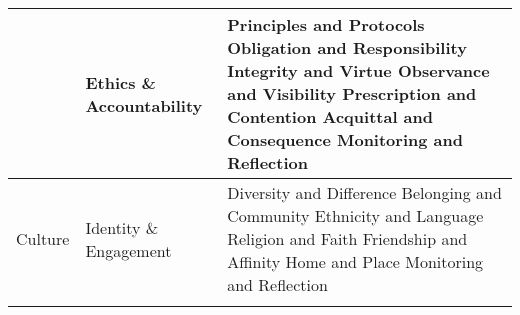\begin{table}[th]
\begin{center}
\begin{tabular}{ >{\raggedright\arraybackslash}p{} >{\raggedright\arraybackslash}p{} >{\raggedright\arraybackslash}p{} }
  & Ethics \& Accountability & Principles and Protocols \linebreak Obligation and Responsibility \linebreak Integrity and Virtue \linebreak Observance and Visibility \linebreak Prescription and Contention \linebreak Acquittal and Consequence \linebreak Monitoring and Reflection \linebreak \\
\hline
Culture & Identity \& Engagement & Diversity and Difference \linebreak Belonging and Community \linebreak Ethnicity and Language \linebreak Religion and Faith \linebreak Friendship and Affinity \linebreak Home and Place \linebreak Monitoring and Reflection \\
\hline
\label{tbl:incomesByUfarmens3}
\end{tabular}
\end{center}
\end{table}

